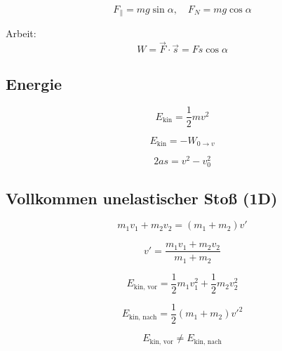 \documentclass[a4paper,12pt]{article}
\begin{document}
\[
F_{\parallel} = mg \sin\alpha, \quad F_N = mg \cos\alpha
\]

Arbeit:
\[
W = \vec{F}\cdot \vec{s} = Fs\cos\alpha
\]

\vspace{0.5cm}

\subsection*{Energie}

\[
E_{\text{kin}} = \frac{1}{2}mv^2
\]

\[
E_{\text{kin}} = -W_{0 \to v}
\]

\[
2as = v^2 - v_0^2
\]

\vspace{0.5cm}

\subsection*{Vollkommen unelastischer Stoß (1D)}


\[
m_1 v_1 + m_2 v_2 = (m_1+m_2)v'
\]

\[
v' = \frac{m_1 v_1 + m_2 v_2}{m_1+m_2}
\]

\[
E_{\text{kin, vor}} = \frac{1}{2}m_1 v_1^2 + \frac{1}{2}m_2 v_2^2
\]

\[
E_{\text{kin, nach}} = \frac{1}{2}(m_1+m_2)v'^2
\]

\[
E_{\text{kin, vor}} \neq E_{\text{kin, nach}}
\]
\end{document}
